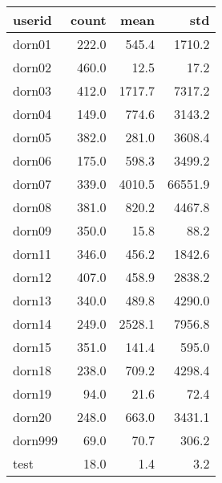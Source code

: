 \begin{tabular}{lrrr}
\toprule
  userid &  count &    mean &      std \\
\midrule
  dorn01 &  222.0 &   545.4 &   1710.2 \\
  dorn02 &  460.0 &    12.5 &     17.2 \\
  dorn03 &  412.0 &  1717.7 &   7317.2 \\
  dorn04 &  149.0 &   774.6 &   3143.2 \\
  dorn05 &  382.0 &   281.0 &   3608.4 \\
  dorn06 &  175.0 &   598.3 &   3499.2 \\
  dorn07 &  339.0 &  4010.5 &  66551.9 \\
  dorn08 &  381.0 &   820.2 &   4467.8 \\
  dorn09 &  350.0 &    15.8 &     88.2 \\
  dorn11 &  346.0 &   456.2 &   1842.6 \\
  dorn12 &  407.0 &   458.9 &   2838.2 \\
  dorn13 &  340.0 &   489.8 &   4290.0 \\
  dorn14 &  249.0 &  2528.1 &   7956.8 \\
  dorn15 &  351.0 &   141.4 &    595.0 \\
  dorn18 &  238.0 &   709.2 &   4298.4 \\
  dorn19 &   94.0 &    21.6 &     72.4 \\
  dorn20 &  248.0 &   663.0 &   3431.1 \\
 dorn999 &   69.0 &    70.7 &    306.2 \\
    test &   18.0 &     1.4 &      3.2 \\
\bottomrule
\end{tabular}
